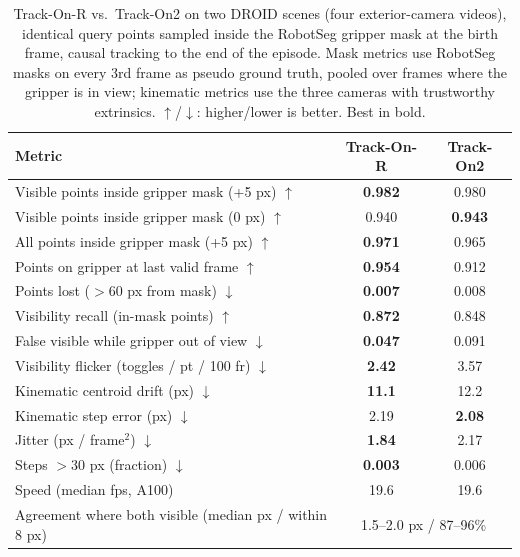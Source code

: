 \begin{table}[t]
\centering
\small
\caption{Track-On-R vs.\ Track-On2 on two DROID scenes (four exterior-camera videos), identical query points sampled inside the RobotSeg gripper mask at the birth frame, causal tracking to the end of the episode. Mask metrics use RobotSeg masks on every 3rd frame as pseudo ground truth, pooled over frames where the gripper is in view; kinematic metrics use the three cameras with trustworthy extrinsics. $\uparrow$/$\downarrow$: higher/lower is better. Best in bold.}
\label{tab:trackon_compare}
\begin{tabular}{lcc}
\toprule
Metric & Track-On-R & Track-On2 \\
\midrule
Visible points inside gripper mask (+5 px) $\uparrow$ & \textbf{0.982} & 0.980 \\
Visible points inside gripper mask (0 px) $\uparrow$ & 0.940 & \textbf{0.943} \\
All points inside gripper mask (+5 px) $\uparrow$ & \textbf{0.971} & 0.965 \\
Points on gripper at last valid frame $\uparrow$ & \textbf{0.954} & 0.912 \\
Points lost ($>60$ px from mask) $\downarrow$ & \textbf{0.007} & 0.008 \\
Visibility recall (in-mask points) $\uparrow$ & \textbf{0.872} & 0.848 \\
False visible while gripper out of view $\downarrow$ & \textbf{0.047} & 0.091 \\
Visibility flicker (toggles / pt / 100 fr) $\downarrow$ & \textbf{2.42} & 3.57 \\
Kinematic centroid drift (px) $\downarrow$ & \textbf{11.1} & 12.2 \\
Kinematic step error (px) $\downarrow$ & 2.19 & \textbf{2.08} \\
Jitter (px / frame$^2$) $\downarrow$ & \textbf{1.84} & 2.17 \\
Steps $>30$ px (fraction) $\downarrow$ & \textbf{0.003} & 0.006 \\
Speed (median fps, A100) & 19.6 & 19.6 \\
\midrule
Agreement where both visible (median px / within 8 px) & \multicolumn{2}{c}{1.5--2.0 px / 87--96\%} \\
\bottomrule
\end{tabular}
\end{table}
